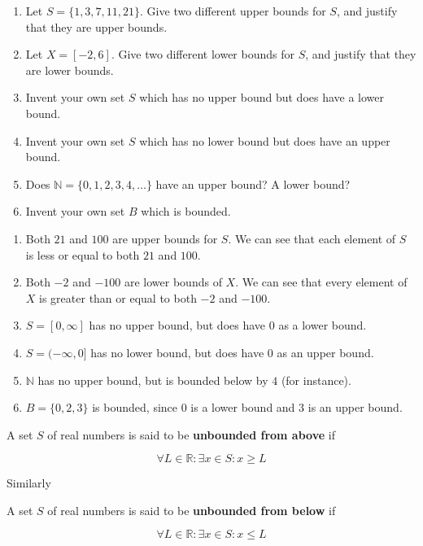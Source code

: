 \begin{xca}
		\begin{enumerate}
				\item Let $S = \{1,3,7,11,21\}$.  Give two different upper bounds for $S$, and justify that they are upper bounds.
				\item Let $X = [-2,6]$.  Give two different lower bounds for $S$, and justify that they are lower bounds.
				\item Invent your own set $S$ which has no upper bound but does have a lower bound.
				\item Invent your own set $S$ which has no lower bound but does have an upper bound.
				\item Does $\mathbb{N} = \{0,1,2,3,4,\dots\}$ have an upper bound? A lower bound?
				\item Invent your own set $B$ which is bounded.
			\end{enumerate}
	\end{xca}

\begin{solutions}
		\begin{enumerate}
				\item Both $21$ and $100$ are upper bounds for $S$.  We can see that each element of $S$ is less or equal to both $21$ and $100$.
				\item Both $-2$ and $-100$ are lower bounds of $X$.  We can see that every element of $X$ is greater than or equal to  both $-2$ and $-100$.
				\item $S = [0,\infty]$ has no upper bound, but does have $0$ as a lower bound.
				\item $S = (-\infty,0]$ has no lower bound, but does have $0$ as an upper bound.
				\item $\mathbb{N}$ has no upper bound, but is bounded below by $4$ (for instance).
				\item $B = \{0,2,3\}$ is bounded, since $0$ is a lower bound and $3$ is an upper bound.
			\end{enumerate}
	\end{solutions}

\begin{definition}
		A set $S$ of real numbers is said to be \textbf{unbounded from above} if 
		
		\[
		\forall L \in \mathbb{R}: \exists x \in S: x \geq L
		\]
		
		Similarly 
		
				A set $S$ of real numbers is said to be \textbf{unbounded from below} if 
		
		\[
		\forall L \in \mathbb{R}: \exists x \in S: x \leq L
		\]
	\end{definition}

